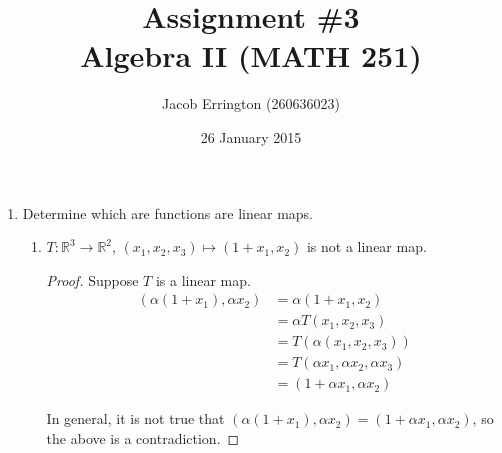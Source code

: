 \documentclass{article}
\author{Jacob Errington (260636023)}
\title{Assignment \#3\\Algebra II (MATH 251)}
\date{26 January 2015}
\renewcommand{\a}{\alpha}
\newcommand{\R}{\mathbb{R}}
\begin{document}
\maketitle

\begin{enumerate}
    \item Determine which are functions are linear maps.
        \begin{enumerate}
            \item $T : \R^3 \to \R^2$, $(x_1, x_2, x_3) \mapsto (1 + x_1, x_2)$ is not a linear map.
                \begin{proof}
                    Suppose $T$ is a linear map.
                    \begin{align*}
                        (\a (1 + x_1), \a x_2) &= \a (1 + x_1, x_2) \\
                                               &= \a T(x_1, x_2, x_3) \\
                                               &= T(\a (x_1, x_2, x_3)) \\
                                               &= T(\a x_1, \a x_2, \a x_3) \\
                                               &= (1 + \a x_1, \a x_2)
                    \end{align*}

                    In general, it is not true that
                    $(\a (1 + x_1), \a x_2) = (1 + \a x_1, \a x_2)$,
                    so the above is a contradiction.
                \end{proof}


\end{enumerate}
\end{enumerate}
\end{document}
